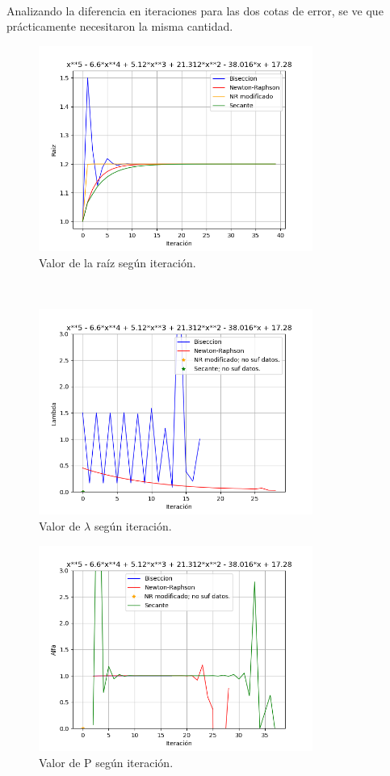 \documentclass[titlepage,a4paper]{article}
\begin{document}
\\Analizando la diferencia en iteraciones para las dos cotas de error, se ve que prácticamente necesitaron la misma cantidad.
\begin{figure}[H]
\centering
\includegraphics[width=0.8\textwidth]{raiz f2.png}
\caption{\label{fig:class01}Valor de la raíz según iteración.}
\end{figure}
\\
\begin{figure}[H]
\centering
\includegraphics[width=0.8\textwidth]{lambda f2.png}
\caption{\label{fig:class01}Valor de $\lambda$ según iteración.}
\end{figure}
\begin{figure}[H]
\centering
\includegraphics[width=0.8\textwidth]{alfa f2.png}
\caption{\label{fig:class01}Valor de P según iteración.}
\end{figure}
\end{document}
